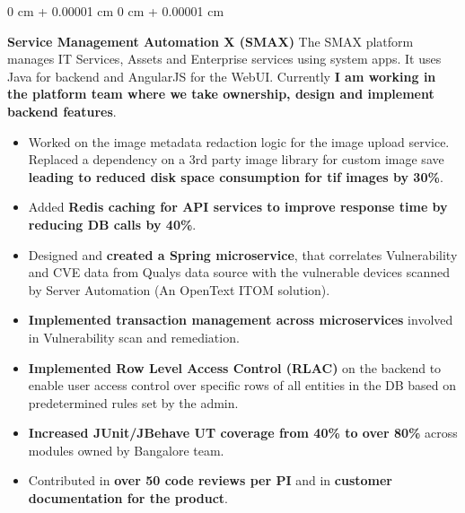 \documentclass[10pt, letterpaper]{article}
\newenvironment{highlights}{
    \begin{itemize}[
        topsep=0.10 cm,
        parsep=0.10 cm,
        partopsep=0pt,
        itemsep=0pt,
        leftmargin=0 cm + 10pt
    ]
}{
    \end{itemize}
} %
\newenvironment{onecolentry}{
    \begin{adjustwidth}{
        0 cm + 0.00001 cm
    }{
        0 cm + 0.00001 cm
    }
}{
    \end{adjustwidth}
} %
\begin{document}
        \vspace{0.20 cm}
        \begin{onecolentry}
            \textbf{Service Management Automation X (SMAX)}
            \newline The SMAX platform manages IT Services, Assets and Enterprise services using system apps. It uses Java for backend and AngularJS for the WebUI. Currently \textbf{I am working in the platform team where we take ownership, design and implement backend features}.
            \begin{highlights}
                \item Worked on the image metadata redaction logic for the image upload service. Replaced a dependency on a 3rd party image library for custom image save \textbf{leading to reduced disk space consumption for tif images by 30\%}.
                \item Added \textbf{Redis caching for API services to improve response time by reducing DB calls by 40\%}.
                \item Designed and \textbf{created a Spring microservice}, that correlates Vulnerability and CVE data from Qualys data source with the vulnerable devices scanned by Server Automation (An OpenText ITOM solution).
                \item \textbf{Implemented transaction management across microservices} involved in Vulnerability scan and remediation.
                \item \textbf{Implemented Row Level Access Control (RLAC)} on the backend to enable user access control over specific rows of all entities in the DB based on predetermined rules set by the admin.
                \item \textbf{Increased JUnit/JBehave UT coverage from 40\% to over 80\%} across modules owned by Bangalore team.
                \item Contributed in \textbf{over 50 code reviews per PI} and in \textbf{customer documentation for the product}.
            \end{highlights}
        \end{onecolentry}
        
\end{document}
